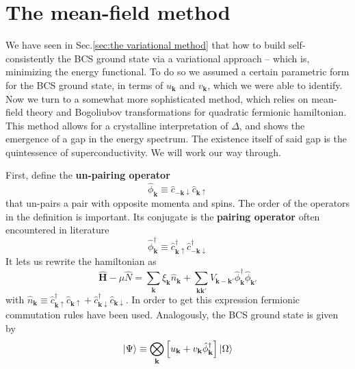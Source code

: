 \section{The mean-field method}

We have seen in Sec.\ref{sec:the variational method} that how to build self-consistently the BCS ground state via a variational approach -- which is, minimizing the energy functional. To do so we assumed a certain parametric form for the BCS ground state, in terms of $u_\mathbf{k}$ and $v_\mathbf{k}$, which we were able to identify. Now we turn to a somewhat more sophisticated method, which relies on mean-field theory and Bogoliubov transformations for quadratic fermionic hamiltonian. This method allows for a crystalline interpretation of $\Delta$, and shows the emergence of a gap in the energy spectrum. The existence itself of said gap is the quintessence of superconductivity. We will work our way through. 

First, define the \textbf{un-pairing operator}
\[
	\hat{\phi}_\mathbf{k} \equiv  \hat{c}_{-\mathbf{k}\downarrow} \hat{c}_{\mathbf{k}\uparrow}
\]
that un-pairs a pair with opposite momenta and spins. The order of the operators in the definition is important. Its conjugate is the \textbf{pairing operator} often encountered in literature
\[
	\hat{\phi}_\mathbf{k}^\dagger \equiv  \hat{c}_{\mathbf{k}\uparrow}^\dagger \hat{c}_{-\mathbf{k}\downarrow}^\dagger
\]
It lets us rewrite the hamiltonian as
\[
	\hat{\bm H} - \mu\hat{N} = \sum_{\mathbf{k}} \xi_{\mathbf{k}} \hat n_\mathbf{k} + \sum_{\mathbf{k}\mathbf{k}'} V_{\mathbf{k}-\mathbf{k}'} \hat{\phi}_\mathbf{k}^\dagger \hat{\phi}_{\mathbf{k}'}
\]
with $\hat{n}_\mathbf{k} \equiv \hat{c}_{\mathbf{k}\uparrow}^\dagger \hat{c}_{\mathbf{k}\uparrow} + \hat{c}_{\mathbf{k}\downarrow}^\dagger \hat{c}_{\mathbf{k}\downarrow}$. In order to get this expression fermionic commutation rules have been used. Analogously, the BCS ground state is given by
\begin{equation}\label{eq:bcs ground state pairing operator form}
	\ket{\Psi} \equiv \bigotimes_\mathbf{k} \left[{u_\mathbf{k} + v_\mathbf{k} \hat{\phi}_\mathbf{k}^\dagger}\right] \ket{\Omega}
\end{equation}


